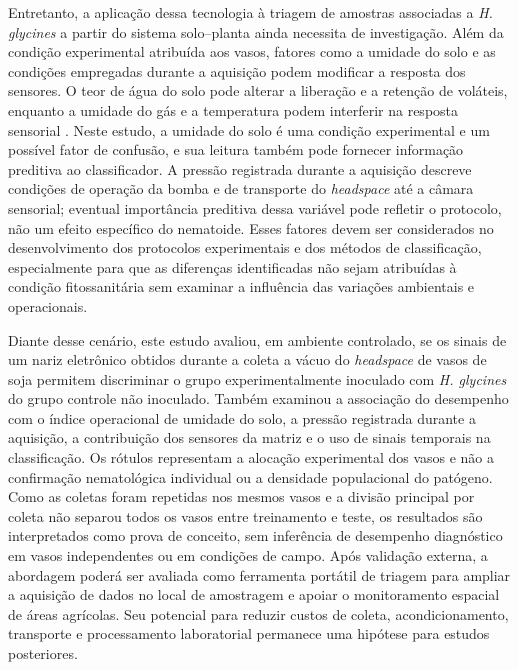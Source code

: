 Entretanto, a aplicação dessa tecnologia à triagem de amostras associadas a \textit{H. glycines} a partir do sistema solo--planta ainda necessita de investigação. Além da condição experimental atribuída aos vasos, fatores como a umidade do solo e as condições empregadas durante a aquisição podem modificar a resposta dos sensores. O teor de água do solo pode alterar a liberação e a retenção de voláteis, enquanto a umidade do gás e a temperatura podem interferir na resposta sensorial \cite{asensio2007,cellini2017}. Neste estudo, a umidade do solo é uma condição experimental e um possível fator de confusão, e sua leitura também pode fornecer informação preditiva ao classificador. A pressão registrada durante a aquisição descreve condições de operação da bomba e de transporte do \textit{headspace} até a câmara sensorial; eventual importância preditiva dessa variável pode refletir o protocolo, não um efeito específico do nematoide. Esses fatores devem ser considerados no desenvolvimento dos protocolos experimentais e dos métodos de classificação, especialmente para que as diferenças identificadas não sejam atribuídas à condição fitossanitária sem examinar a influência das variações ambientais e operacionais.

Diante desse cenário, este estudo avaliou, em ambiente controlado, se os sinais de um nariz eletrônico obtidos durante a coleta a vácuo do \textit{headspace} de vasos de soja permitem discriminar o grupo experimentalmente inoculado com \textit{H. glycines} do grupo controle não inoculado. Também examinou a associação do desempenho com o índice operacional de umidade do solo, a pressão registrada durante a aquisição, a contribuição dos sensores da matriz e o uso de sinais temporais na classificação. Os rótulos representam a alocação experimental dos vasos e não a confirmação nematológica individual ou a densidade populacional do patógeno. Como as coletas foram repetidas nos mesmos vasos e a divisão principal por coleta não separou todos os vasos entre treinamento e teste, os resultados são interpretados como prova de conceito, sem inferência de desempenho diagnóstico em vasos independentes ou em condições de campo. Após validação externa, a abordagem poderá ser avaliada como ferramenta portátil de triagem para ampliar a aquisição de dados no local de amostragem e apoiar o monitoramento espacial de áreas agrícolas. Seu potencial para reduzir custos de coleta, acondicionamento, transporte e processamento laboratorial permanece uma hipótese para estudos posteriores.
